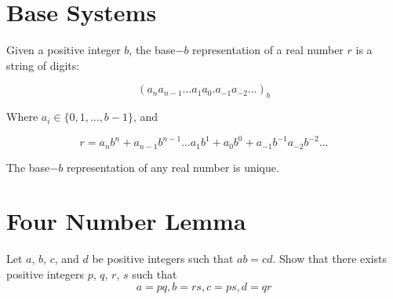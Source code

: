 \begin{theorem}
\end{theorem}

\begin{theorem}
\end{theorem}

\section{Base Systems}
\begin{definition}
    Given a positive integer $b$, the base$-b$ representation of a real number $r$ is a string of digits:
    
    \[
    {(a_n a_{n-1} \dots a_1 a_0.a_{-1} a_{-2} \dots)}_{b}
    \]

    Where $a_i \in \{0,1,\dots, b-1\}$, and

    \[
    r= a_n b^n+a_{n-1} b^{n-1} \dots a_1 b^{1}+ a_0 b^{0}+a_{-1}b^{-1} a_{-2}b^{-2} \dots
    \]
\end{definition}

\begin{theorem}
    The base$-b$ representation of any real number is unique.
\end{theorem}

\section{Four Number Lemma}

\begin{theorem}
Let $a$, $b$, $c$, and $d$ be positive integers such that $ab = cd$. Show that there exists positive
integers $p$, $q$, $r$, $s$ such that
\[a = pq, b = rs, c = ps, d = qr\]
\end{theorem}


